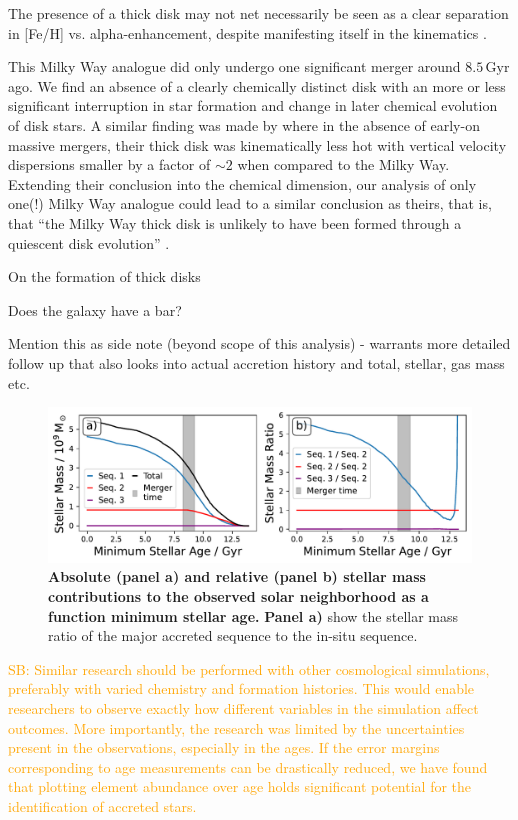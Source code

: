 \documentclass[fleqn,usenatbib]{mnras}
\newcommand{\SB}[1]{{\textcolor{orange}{SB: #1}}}
\begin{document}
The presence of a thick disk may not net necessarily be seen as a clear separation in [Fe/H] vs. alpha-enhancement, despite manifesting itself in the kinematics \citep[see e.g.][their Fig.~12]{MCM2013}.

This Milky Way analogue did only undergo one significant merger around $8.5\,\mathrm{Gyr}$ ago. We find an absence of a clearly chemically distinct disk with an more or less significant interruption in star formation and change in later chemical evolution of disk stars. A similar finding was made by \citet{MCM2013} where in the absence of early-on massive mergers, their thick disk was kinematically less hot with vertical velocity dispersions smaller by a factor of $\sim 2$ when compared to the Milky Way. Extending their conclusion into the chemical dimension, our analysis of only one(!) Milky Way analogue could lead to a similar conclusion as theirs, that is, that ``the Milky Way thick disk is unlikely to have been formed through a quiescent disk evolution'' \citep{MCM2013}.

On the formation of thick disks \citep{Minchev2015}

Does the galaxy have a bar?

Mention this as side note (beyond scope of this analysis) - warrants more detailed follow up that also looks into actual accretion history and total, stellar, gas mass etc.

\begin{figure}
	\includegraphics[width=\columnwidth]{figures/sequence_mass_ratios.pdf}
    \caption{
    \textbf{Absolute (panel a) and relative (panel b) stellar mass contributions to the observed solar neighborhood as a function minimum stellar age.}
    \textbf{Panel a)} show the stellar mass ratio of the major accreted sequence to the in-situ sequence.
    }
    \label{fig:sequence_mass_ratios}
\end{figure}

\SB{Similar research should be performed with other cosmological simulations, preferably with varied chemistry and formation histories. This would enable researchers to observe exactly how different variables in the simulation affect outcomes. More importantly, the research was limited by the uncertainties present in the observations, especially in the ages. If the error margins corresponding to age measurements can be drastically reduced, we have found that plotting element abundance over age holds significant potential for the identification of accreted stars.}
\end{document}
